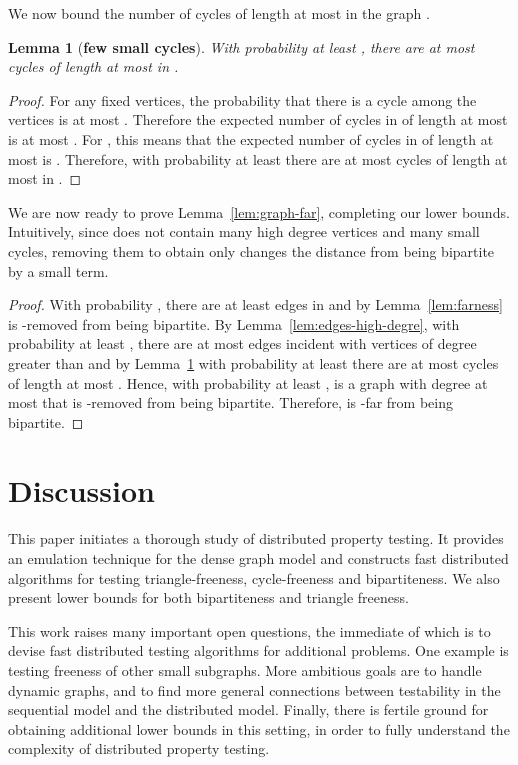 \documentclass[11pt]{article}
\newtheorem{lemma}[theorem]{Lemma}
\begin{document}
We now bound the number of cycles of length at most  in the graph .
\begin{lemma}[\textbf{few small cycles}]
  With probability at least , there are at most  cycles of length at most  in .
  \label{lem:cycles}
\end{lemma}
\begin{proof}
  For any  fixed vertices, the probability that there is a cycle among the  vertices is at
  most .  Therefore the expected number of cycles in  of length at most  is at
  most . For , this means that the expected number of cycles in  of
  length at most  is . Therefore, with probability at least  there are at
  most  cycles of length at most  in .
\end{proof}



We are now ready to prove Lemma~\ref{lem:graph-far}, completing our lower bounds. Intuitively, since  does not contain many high degree vertices and many small cycles, removing them to obtain  only changes the distance from being bipartite by a small term.
\begin{proof}
  With probability , there are at least  edges in  and by Lemma~\ref{lem:farness}  is -removed from
  being bipartite. By Lemma~\ref{lem:edges-high-degre}, with probability at least ,
  there are at most  edges incident with vertices of degree greater than  and by Lemma~\ref{lem:cycles} with
  probability at least  there are at most  cycles of length at most .
  Hence, with probability at least ,  is a graph with degree at most
   that is -removed from being bipartite.  Therefore,  is -far from being
  bipartite.
\end{proof}




\section{Discussion}
\label{sec:discussion}
This paper initiates a thorough study of distributed property testing. It provides an emulation technique for the dense graph model and constructs fast
distributed algorithms for testing triangle-freeness, cycle-freeness and bipartiteness. We also present lower bounds for both bipartiteness and triangle freeness.   

This work raises many important open questions, the immediate of which is to devise fast distributed testing algorithms for additional problems. One example is testing freeness of other small subgraphs.
More ambitious goals are to handle dynamic graphs, and to find more general connections between testability in the sequential model and the distributed model.
Finally, there is fertile ground for obtaining additional lower bounds in this setting, in order to fully
understand the complexity of distributed property testing.	



\end{document}
